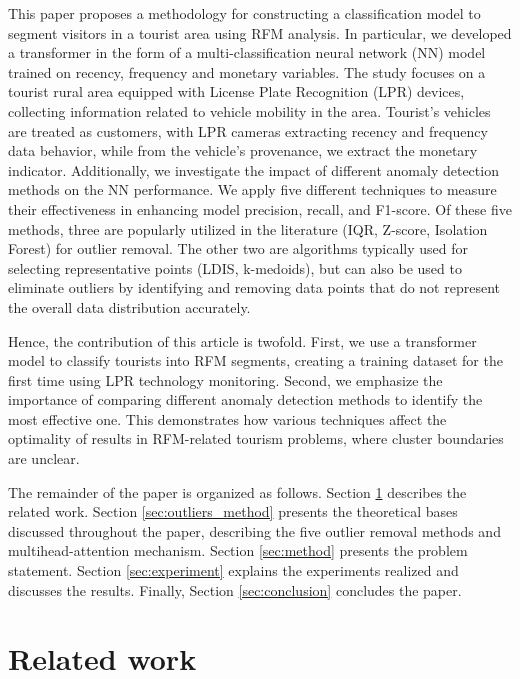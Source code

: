 \documentclass{ws-ijitdm}
\begin{document}
This paper proposes a methodology for constructing a classification model to segment visitors in a tourist area using RFM analysis. In particular, we developed a transformer in the form of a multi-classification neural network (NN) model trained on recency, frequency and monetary variables. The study focuses on a tourist rural area equipped with License Plate Recognition (LPR) devices, collecting information related to vehicle mobility in the area. Tourist's vehicles are treated as customers, with LPR cameras extracting recency and frequency data behavior, while from the vehicle's provenance, we extract the monetary indicator. Additionally, we investigate the impact of different anomaly detection methods on the NN performance. We apply five different techniques to measure their effectiveness in enhancing model precision, recall, and F1-score. Of these five methods, three are popularly utilized in the literature (IQR, Z-score, Isolation Forest) for outlier removal. The other two are algorithms typically used for selecting representative points (LDIS, k-medoids), but can also be used to eliminate outliers by identifying and removing data points that do not represent the overall data distribution accurately.

Hence, the contribution of this article is twofold. First, we use a transformer model to classify tourists into RFM segments, creating a training dataset for the first time using LPR technology monitoring. Second, we emphasize the importance of comparing different anomaly detection methods to identify the most effective one. This demonstrates how various techniques affect the optimality of results in RFM-related tourism problems, where cluster boundaries are unclear.

The remainder of the paper is organized as follows. Section \ref{sec:literature} describes the related work. Section \ref{sec:outliers_method} presents the theoretical bases discussed throughout the paper, describing the five outlier removal methods and multihead-attention mechanism. Section \ref{sec:method} presents the problem statement. Section \ref{sec:experiment} explains the experiments realized and discusses the results. Finally, Section \ref{sec:conclusion} concludes the paper.

\section{Related work} \label{sec:literature}
\end{document}

